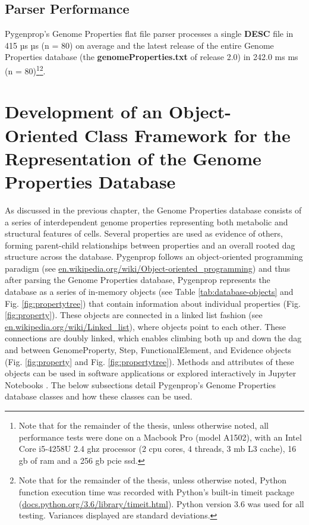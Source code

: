 \subsection{Parser Performance}

Pygenprop's Genome Properties flat file parser processes a single \textbf{DESC} 
file in 415 µs  µs (\gls{n} = 80) on average and the latest release of 
the entire Genome Properties database (the \textbf{genomeProperties.txt} of 
release 2.0) in 242.0 ms  ms (\gls{n} = 80)\footnote{Note that for 
the remainder of the thesis, unless otherwise noted, all performance tests were 
done on a Macbook Pro (model A1502), with an Intel Core i5-4258U 2.4 \gls{ghz} 
processor (2 \gls{cpu} cores, 4 threads, 3 \gls{mb} L3 cache), 16 \gls{gb} of 
\gls{ram} and a 256 \gls{gb}  \gls{pcie} \gls{ssd}.}\footnote{Note that for the 
remainder of the thesis, unless otherwise noted, Python function execution time 
was recorded with Python's built-in timeit package 
(\href{http://docs.python.org/3.6/library/timeit.html}{docs.python.org/3.6/library/timeit.html}). 
Python version 3.6 was used for all testing. Variances displayed are standard 
deviations.}.

\section{Development of an Object-Oriented Class Framework for the 
Representation of the Genome Properties Database} \label{genomeprop-oop}

As discussed in the previous chapter, the Genome Properties database consists of 
a series of interdependent genome properties representing both metabolic and 
structural features of cells. Several properties are used as evidence of others, 
forming parent-child relationships between properties and an overall rooted 
\gls{dag} structure across the database. Pygenprop follows an object-oriented 
programming paradigm \cite{booch1986object} (see 
\href{http://en.wikipedia.org/wiki/Object-oriented_programming}{en.wikipedia.org/wiki/Object-oriented\_programming}) 
and thus after parsing the Genome Properties database, Pygenprop represents the 
database as a series of in-memory objects (see Table \ref{tab:database-objects} 
and Fig. \ref{fig:propertytree}) that contain information about individual 
properties (Fig. \ref{fig:property}). These objects are connected in a linked 
list fashion \cite{newell1957programming} (see 
\href{http://en.wikipedia.org/wiki/Linked_list}{en.wikipedia.org/wiki/Linked\_list}), 
where objects point to each other. These connections are doubly linked, which 
enables climbing both up and down the \gls{dag} and between GenomeProperty, 
Step, FunctionalElement, and Evidence objects (Fig. \ref{fig:property} and Fig. 
\ref{fig:propertytree}). Methods and attributes of these objects can be used in 
software applications or explored interactively in Jupyter Notebooks 
\cite{kluyver2016jupyter}. The below subsections detail Pygenprop's Genome 
Properties database classes and how these classes can be used. 

